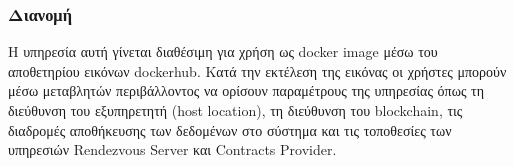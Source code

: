 \subsubsection{Διανομή}

Η υπηρεσία αυτή γίνεται διαθέσιμη για χρήση ως docker image μέσω του αποθετηρίου εικόνων dockerhub. Κατά την εκτέλεση της εικόνας οι χρήστες μπορούν μέσω μεταβλητών περιβάλλοντος να ορίσουν παραμέτρους της υπηρεσίας όπως τη διεύθυνση του εξυπηρετητή (host location), τη διεύθυνση του blockchain, τις διαδρομές αποθήκευσης των δεδομένων στο σύστημα και τις τοποθεσίες των υπηρεσιών Rendezvous Server και Contracts Provider.
